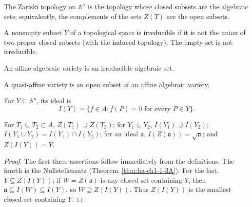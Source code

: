 \begin{definition}
\label{def:ha-ch1-zariski-topology}
The Zariski topology on $\mathbb A^n$ is the topology whose closed subsets are the algebraic
sets; equivalently, the complements of the sets $Z(T)$ are the open subsets.
\end{definition}

\begin{definition}
\label{def:ha-ch1-irreducible-subset}
A nonempty subset $Y$ of a topological space is irreducible if it is not the union of two proper
closed subsets (with the induced topology). The empty set is not irreducible.
\end{definition}

\begin{definition}
\label{def:ha-ch1-affine-variety}
An affine algebraic variety is an irreducible algebraic set.
\end{definition}

\begin{definition}
\label{def:ha-ch1-quasi-affine-variety}
A quasi-affine variety is an open subset of an affine algebraic variety.
\end{definition}

\begin{definition}
\label{def:ha-ch1-vanishing-ideal}
\leanok
For $Y\subseteq\mathbb A^n$, its ideal is
\[
 I(Y)=\{f\in A:f(P)=0\text{ for every }P\in Y\}.
\]
\end{definition}

\begin{proposition}
\label{prop:ha-ch1-1-2}
For $T_1\subseteq T_2\subset A$, $Z(T_1)\supseteq Z(T_2)$; for $Y_1\subseteq Y_2$,
$I(Y_1)\supseteq I(Y_2)$; $I(Y_1\cup Y_2)=I(Y_1)\cap I(Y_2)$; for an ideal $\mathfrak a$,
$I(Z(\mathfrak a))=\sqrt{\mathfrak a}$; and $Z(I(Y))=\overline Y$.
\end{proposition}
\begin{proof}
The first three assertions follow immediately from the definitions.  The fourth is the
Nullstellensatz (Theorem~\ref{thm:ha-ch1-1-3A}).  For the last, $Y\subseteq Z(I(Y))$; if
$W=Z(\mathfrak a)$ is any closed set containing $Y$, then $\mathfrak a\subseteq I(W)\subseteq I(Y)$,
so $W\supseteq Z(I(Y))$.  Thus $Z(I(Y))$ is the smallest closed set containing $Y$.
\end{proof}

